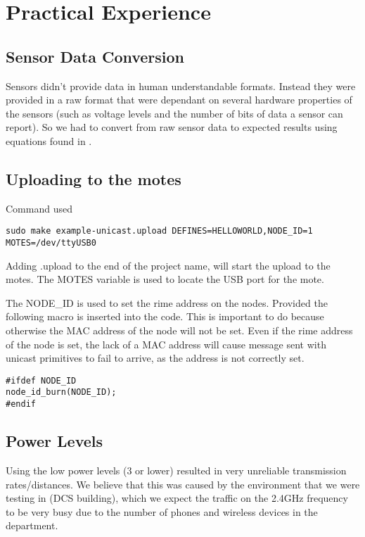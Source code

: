 \section{Practical Experience}

\subsection{Sensor Data Conversion}
Sensors didn't provide data in human understandable formats. Instead they were provided in a raw format that were dependant on several hardware properties of the sensors (such as voltage levels and the number of bits of data a sensor can report). So we  had to convert from raw sensor data to expected results using equations found in \cite{sensiriondatasheet}.

\subsection{Uploading to the motes}
Command used
\begin{listing}
\begin{verbatim}
sudo make example-unicast.upload DEFINES=HELLOWORLD,NODE_ID=1 MOTES=/dev/ttyUSB0
\end{verbatim}
\end{listing}
Adding .upload to the end of the project name, will start the upload to the motes. The MOTES variable is used to locate the USB port for the mote.

The NODE\_ID is used to set the rime address on the nodes. Provided the following macro is inserted into the code. This is important to do because otherwise the MAC address of the node will not be set. Even if the rime address of the node is set, the lack of a MAC address will cause message sent with unicast primitives to fail to arrive, as the address is not correctly set.

\begin{listing} 
\begin{verbatim}
#ifdef NODE_ID
node_id_burn(NODE_ID);
#endif
\end{verbatim}
\end{listing}


\subsection{Power Levels}
Using the low power levels (3 or lower) resulted in very unreliable transmission rates/distances. We believe that this was caused by the environment that we were testing in (DCS building), which we expect the traffic on the 2.4GHz frequency to be very busy due to the number of phones and wireless devices in the department.

